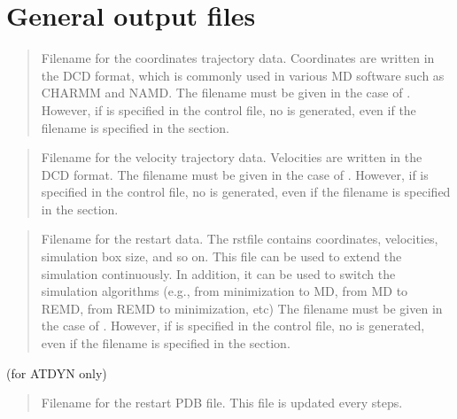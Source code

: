 \documentclass[a4paper,11pt,oneside,english]{sphinxmanual}
\begin{document}
\section{General output files}
\label{\detokenize{04_Output:general-output-files}}
\begin{quote}

Filename for the coordinates trajectory data.
Coordinates are written in the DCD format,
which is commonly used in various MD software such as CHARMM and NAMD.
The filename must be given in the case of .
However, if  is specified in the control file,
no  is generated, even if the filename is specified
in the \sphinxstylestrong{{[}OUTPUT{]}} section.
\end{quote}

\begin{quote}

Filename for the velocity trajectory data.
Velocities are written in the DCD format.
The filename must be given in the case of .
However, if  is specified in the control file,
no  is generated, even if the filename is specified
in the \sphinxstylestrong{{[}OUTPUT{]}} section.
\end{quote}

\begin{quote}

Filename for the restart data.
The rstfile contains coordinates, velocities, simulation box size, and so on.
This file can be used to extend the simulation continuously.
In addition, it can be used to switch the simulation algorithms
(e.g., from minimization to MD, from MD to REMD, from REMD to minimization, etc)
The filename must be given in the case of .
However, if  is specified in the control file,
no  is generated, even if the filename is specified
in the \sphinxstylestrong{{[}OUTPUT{]}} section.
\end{quote}

 (for ATDYN only)
\begin{quote}

Filename for the restart PDB file. This file is updated every  steps.
\end{quote}
\end{document}
